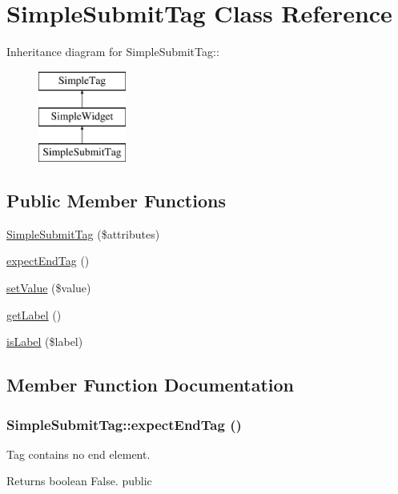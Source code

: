 \hypertarget{class_simple_submit_tag}{
\section{SimpleSubmitTag Class Reference}
\label{class_simple_submit_tag}
}
Inheritance diagram for SimpleSubmitTag::\begin{figure}[H]
\begin{center}
\leavevmode
\includegraphics[height=3cm]{class_simple_submit_tag}
\end{center}
\end{figure}
\subsection*{Public Member Functions}
\begin{DoxyCompactItemize}
\item 
\hyperlink{class_simple_submit_tag_aa14e42ef1feaa738803f342e125fb316}{SimpleSubmitTag} (\$attributes)
\item 
\hyperlink{class_simple_submit_tag_acab5ba6ae3a20d534172d2da5fb2d363}{expectEndTag} ()
\item 
\hyperlink{class_simple_submit_tag_ac0e27babe9c5af762b7d9135062ebcf6}{setValue} (\$value)
\item 
\hyperlink{class_simple_submit_tag_a5c392cbc3bd27f267fd4763659745385}{getLabel} ()
\item 
\hyperlink{class_simple_submit_tag_ab9604de20ab0d5d86de8603780c5fd61}{isLabel} (\$label)
\end{DoxyCompactItemize}


\subsection{Member Function Documentation}
\hypertarget{class_simple_submit_tag_acab5ba6ae3a20d534172d2da5fb2d363}{
\subsubsection[{expectEndTag}]{\setlength{\rightskip}{0pt plus 5cm}SimpleSubmitTag::expectEndTag ()}}
\label{class_simple_submit_tag_acab5ba6ae3a20d534172d2da5fb2d363}
Tag contains no end element. \begin{DoxyReturn}{Returns}
boolean False.  public 
\end{DoxyReturn}


